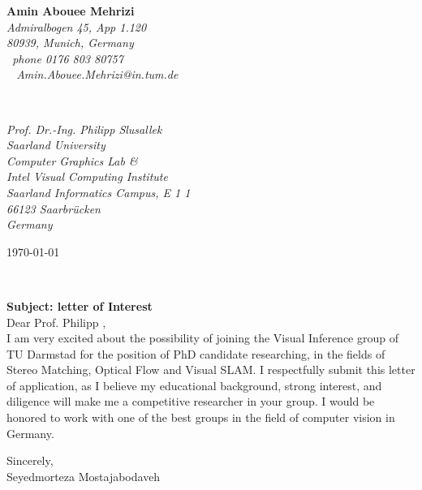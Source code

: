 \documentclass[11pt]{article}
\begin{document}
\hfill%
\begin{minipage}[t]{.6\textwidth}
\raggedleft%
\vspace{20 mm}
{\bfseries Amin Abouee Mehrizi}\\[.35ex]
\small\itshape%
Admiralbogen 45, App 1.120\\
80939, Munich, Germany\\
\Telefon~phone 0176 803 80757\\
\Letter~ Amin.Abouee.Mehrizi@in.tum.de\\
\end{minipage}\\[1em]
%
\begin{minipage}[t]{.4\textwidth}
\raggedright%
\vspace{15 mm}
\small\itshape%
Prof. Dr.-Ing. Philipp Slusallek\\
Saarland University\\
Computer Graphics Lab \&\\
Intel Visual Computing Institute\\
Saarland Informatics Campus, E 1 1\\
66123 Saarbr{\"u}cken\\
Germany\\[0.5em]
\end{minipage}
\hfill %
\begin{minipage}[t]{.4\textwidth}
\raggedleft %
\today
\end{minipage}\\[3em]
\begin{description}
\textbf{Subject: letter of Interest}\\[1.0em]
Dear Prof. Philipp ,\\
I am very excited about the possibility of joining the Visual Inference group of TU Darmstad for the position of PhD candidate researching, in the fields of Stereo Matching, Optical Flow and Visual SLAM. I respectfully submit this letter of application, as I believe my educational background, strong interest, and diligence will make me a competitive researcher in your group. I would be honored to work with one of the best groups in the field of computer vision in Germany.\\[.6em]
\end{description}

Sincerely,\\
Seyedmorteza Mostajabodaveh
 
\end{document}
